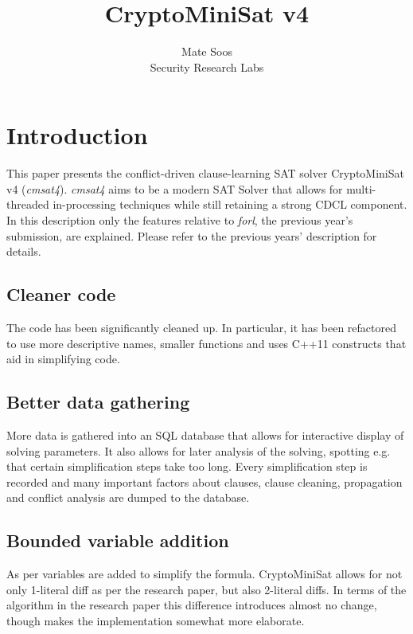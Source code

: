 \documentclass[final]{ieee}
\begin{document}
\title{CryptoMiniSat v4}
\author{Mate Soos\\Security Research Labs}

\maketitle
\thispagestyle{empty}
\pagestyle{empty}

\section{Introduction}
This paper presents the conflict-driven clause-learning SAT solver CryptoMiniSat v4 (\emph{cmsat4}). \emph{cmsat4} aims to be a modern SAT Solver that allows for multi-threaded in-processing techniques while still retaining a strong CDCL component. In this description only the features relative to \emph{forl}, the previous year's submission, are explained. Please refer to the previous years' description for details.


\subsection{Cleaner code}
The code has been significantly cleaned up. In particular, it has been refactored to use more descriptive names, smaller functions and uses C++11 constructs that aid in simplifying code.

\subsection{Better data gathering}
More data is gathered into an SQL database that allows for interactive display of solving parameters. It also allows for later analysis of the solving, spotting e.g. that certain simplification steps take too long. Every simplification step is recorded and many important factors about clauses, clause cleaning, propagation and conflict analysis are dumped to the database.

\subsection{Bounded variable addition}
As per \cite{DBLP:conf/hvc/MantheyHB12}
variables are added to simplify the formula. CryptoMiniSat allows for not only 1-literal diff as per the research paper, but also 2-literal diffs. In terms of the algorithm in the research paper this difference introduces almost no change, though makes the implementation somewhat more elaborate.
\end{document}

